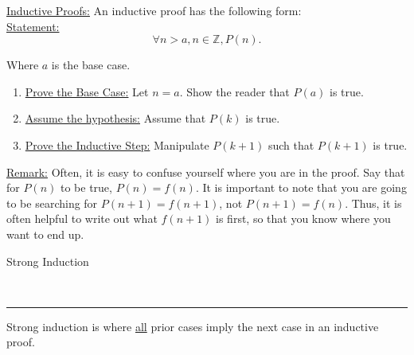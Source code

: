 \documentclass{article}
\newcommand{\header}[1]{\begin{large}\noindent #1\end{large}\\\rule{\textwidth}{0.5pt}}
\newcommand{\gap}{\medskip\\}
\newcommand{\centertext}[1]{\begin{center}#1\end{center}}
\newcommand{\sheader}[1]{\underline{#1:}}
\begin{document}
\sheader{Inductive Proofs} An inductive proof has the following form:
\gap
\sheader{Statement} 
\[
    \forall n > a, n \in \mathbb{Z}, P(n).
\]
\centertext{Where $a$ is the base case.}
\begin{enumerate}
    \item \sheader{Prove the Base Case} Let $n = a$. Show the reader that $P(a)$ is true.
    \item \sheader{Assume the hypothesis} Assume that $P(k)$ is true. 
    \item \sheader{Prove the Inductive Step} Manipulate $P(k + 1)$ such that $P(k + 1)$ is true.
\end{enumerate}
\sheader{Remark} Often, it is easy to confuse yourself where you are in the proof.
Say that for $P(n)$ to be true, $P(n) = f(n)$. It is important to note that you are
going to be searching for $P(n + 1) = f(n + 1)$, not $P(n + 1) = f(n)$. Thus, it is 
often helpful to write out what $f(n + 1)$ is first, so that you know where you want 
to end up.

\header{Strong Induction}
Strong induction is where \underline{all} prior cases imply the next case in an
inductive proof.
\end{document}
